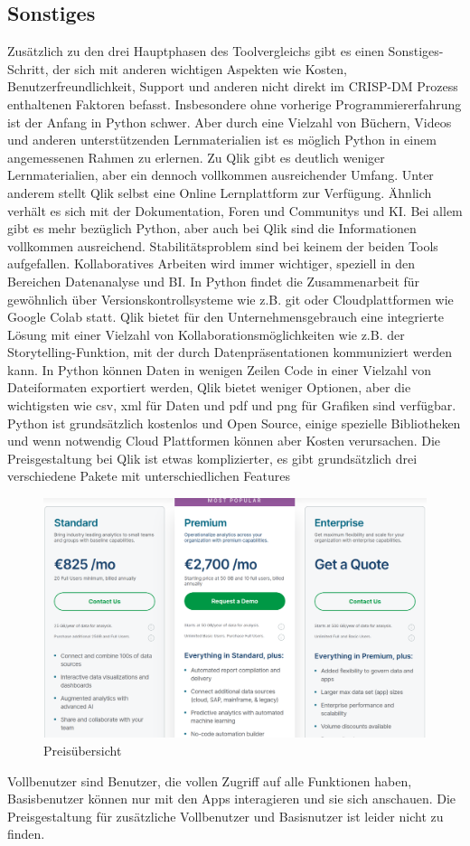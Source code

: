 \documentclass[12pt]{article}
\begin{document}
	\subsection{Sonstiges}
	Zusätzlich zu den drei Hauptphasen des Toolvergleichs gibt es einen Sonstiges-Schritt, der sich mit anderen wichtigen Aspekten wie Kosten, Benutzerfreundlichkeit, Support und anderen nicht direkt im CRISP-DM Prozess enthaltenen Faktoren befasst.
	Insbesondere ohne vorherige Programmiererfahrung ist der Anfang in Python schwer. Aber durch eine Vielzahl von Büchern, Videos und anderen unterstützenden Lernmaterialien ist es möglich Python in einem angemessenen Rahmen zu erlernen. Zu Qlik gibt es deutlich weniger Lernmaterialien, aber ein dennoch vollkommen ausreichender Umfang. Unter anderem stellt Qlik selbst eine Online Lernplattform zur Verfügung. Ähnlich verhält es sich mit der Dokumentation, Foren und Communitys und KI. Bei allem gibt es mehr bezüglich Python, aber auch bei Qlik sind die Informationen vollkommen ausreichend. Stabilitätsproblem sind bei keinem der beiden Tools aufgefallen. Kollaboratives Arbeiten wird immer wichtiger, speziell in den Bereichen Datenanalyse und BI. In Python findet die Zusammenarbeit für gewöhnlich über Versionskontrollsysteme wie z.B. git oder Cloudplattformen wie Google Colab statt. Qlik bietet für den Unternehmensgebrauch eine integrierte Lösung mit einer Vielzahl von Kollaborationsmöglichkeiten wie z.B. der Storytelling-Funktion, mit der durch Datenpräsentationen kommuniziert werden kann.
	In Python können Daten in wenigen Zeilen Code in einer Vielzahl von Dateiformaten exportiert werden, Qlik bietet weniger Optionen, aber die wichtigsten wie csv, xml für Daten und pdf und png für Grafiken sind verfügbar. Python ist grundsätzlich kostenlos und Open Source, einige spezielle Bibliotheken und wenn notwendig Cloud Plattformen können aber Kosten verursachen. Die Preisgestaltung bei Qlik ist etwas komplizierter, es gibt grundsätzlich drei verschiedene Pakete mit unterschiedlichen Features %
	\begin{figure}[h]
		\centering
		\includegraphics[width=1.0\textwidth]{prices}
		\caption{Preisübersicht}
	\end{figure}
	 Vollbenutzer sind Benutzer, die vollen Zugriff auf alle Funktionen haben, Basisbenutzer können nur mit den Apps interagieren und sie sich anschauen.
	Die Preisgestaltung für zusätzliche Vollbenutzer und Basisnutzer ist leider nicht zu finden.
\end{document}
